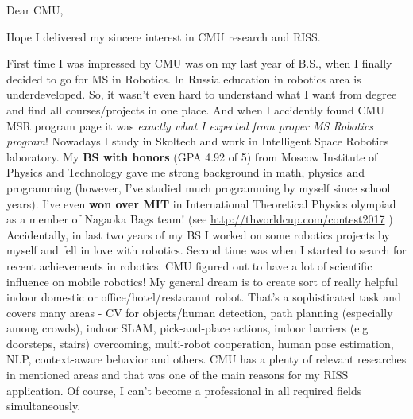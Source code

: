 \documentclass[11pt,a4paper,roman]{moderncv}        %
\begin{document}
\date{\today}
\opening{Dear CMU,}
\closing{Hope I delivered my sincere interest in CMU research and RISS.}
\makelettertitle
First time I was impressed by CMU was on my last year of B.S., when I finally decided to go for MS in Robotics. In Russia education in robotics area is underdeveloped. So, it wasn't even hard to understand what I want from degree and find all courses/projects in one place. And when I accidently found CMU MSR program page it was \textit{exactly what I expected from proper MS Robotics program}! Nowadays I study in Skoltech and work  in Intelligent Space Robotics laboratory. My \textbf{BS with honors} (GPA 4.92 of 5) from Moscow Institute of Physics and Technology gave me strong background in math, physics and programming (however, I've studied much programming by myself since school years). I've even \textbf{won over MIT} in International Theoretical Physics olympiad as a member of Nagaoka Bags team! (see \url{http://thworldcup.com/contest2017} ) Accidentally, in last two years of my BS I worked on some robotics projects by myself and fell in love with robotics.
\newline
\newline
Second time was when I started to search for recent achievements in robotics. CMU figured out to have a lot of scientific influence on mobile robotics! My general dream is to create sort of really helpful indoor domestic or office/hotel/restaraunt robot. That's a sophisticated task and covers many areas - CV for objects/human detection, path planning (especially among crowds), indoor SLAM, pick-and-place actions, indoor barriers (e.g doorsteps, stairs) overcoming, multi-robot cooperation, human pose estimation, NLP, context-aware behavior and others. CMU has a plenty of relevant researches in mentioned areas and that was one of the main reasons for my RISS application. Of course, I can't become a professional in all required fields simultaneously. 
\newline
\newline 
\end{document}
